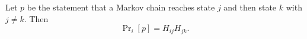 Let $p$ be the statement that a Markov chain reaches state $j$ and then state $k$ with $j \neq k$. Then
$$\Pr\nolimits_i[p] = H_{ij} H_{jk}.$$
